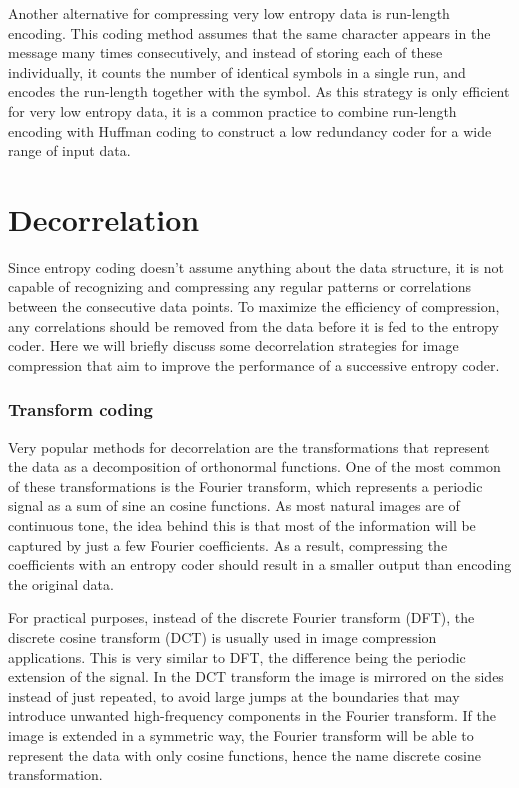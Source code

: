       Another alternative for compressing very low entropy data is run-length encoding. This coding method assumes that the same character appears in the message many times consecutively, and instead of storing each of these individually, it counts the number of identical symbols in a single run, and encodes the run-length together with the symbol. As this strategy is only efficient for very low entropy data, it is a common practice to combine run-length encoding with Huffman coding to construct a low redundancy coder for a wide range of input data.
  
    \section{Decorrelation}
      \label{sec:decorrelation}
      Since entropy coding doesn't assume anything about the data structure, it is not capable of recognizing and compressing any regular patterns or correlations between the consecutive data points. To maximize the efficiency of compression, any correlations should be removed from the data before it is fed to the entropy coder. Here we will briefly discuss some decorrelation strategies for image compression that aim to improve the performance of a successive entropy coder.

      \subsubsection{Transform coding}
      Very popular methods for decorrelation are the transformations that represent the data as a decomposition of orthonormal functions. One of the most common of these transformations is the Fourier transform, which represents a periodic signal as a sum of sine an cosine functions. As most natural images are of continuous tone, the idea behind this is that most of the information will be captured by just a few Fourier coefficients. As a result, compressing the coefficients with an entropy coder should result in a smaller output than encoding the original data.

      For practical purposes, instead of the discrete Fourier transform (DFT), the discrete cosine transform (DCT) \cite{ahmed_discrete_1974} is usually used in image compression applications. This is very similar to DFT, the difference being the periodic extension of the signal. In the DCT transform the image is mirrored on the sides instead of just repeated, to avoid large jumps at the boundaries that may introduce unwanted high-frequency components in the Fourier transform. If the image is extended in a symmetric way, the Fourier transform will be able to represent the data with only cosine functions, hence the name discrete cosine transformation.


